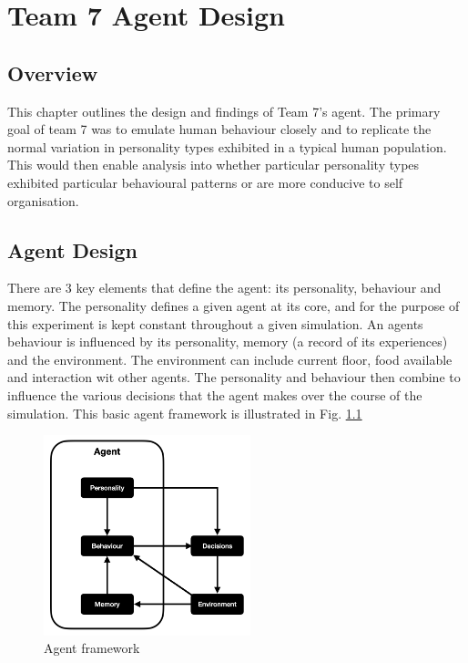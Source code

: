 \chapter{Team 7 Agent Design}\label{team_7_agent_design}

\section{Overview}
\label{sec: Team 7 Overview}
This chapter outlines the design and findings of Team 7's agent. The primary goal of team 7 was to emulate human behaviour closely and to replicate the normal variation in personality types exhibited in a typical human population. This would then enable analysis into whether particular personality types exhibited particular behavioural patterns or are more conducive to self organisation.

\section{Agent Design}
\label{sec: Agent Design}

There are 3 key elements that define the agent: its personality, behaviour and memory. The personality defines a given agent at its core, and for the purpose of this experiment is kept constant throughout a given simulation. An agents behaviour is influenced by its personality, memory (a record of its experiences) and the environment. The environment can include current floor, food available and interaction wit other agents. The personality and behaviour then combine to influence the various decisions that the agent makes over the course of the simulation. 
This basic agent framework is illustrated in Fig. \ref{agent_flow}

\begin{figure}[H]
    \begin{center}
        \includegraphics[width=6cm]{Images/agent_flow.png}
    \end{center}
    \caption{Agent framework}
    \label{agent_flow}
\end{figure}

